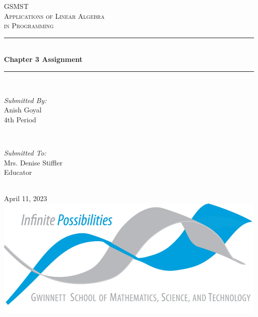 \begin{titlepage}

    \newcommand{\HRule}{\rule{\linewidth}{0.5mm}}
    
    \center
    
    \textsc{\LARGE GSMST }\\[0.3cm]
    \textsc{\Large Applications of Linear Algebra }\\[0.3cm]
    \textsc{\Large in Programming}\\[0.5cm]
    
    \HRule \\[0.4cm]
    { \huge \bfseries Chapter 3 Assignment}\\[0.03cm]
    \HRule \\[1.5cm]
    
    \begin{minipage}{0.4\textwidth}
    \begin{flushleft} \large
    \emph{Submitted By:}\\
    Anish Goyal \\4th Period
    \end{flushleft}
    \end{minipage}
    ~
    \begin{minipage}{0.4\textwidth}
    \begin{flushright} \large
    \emph{Submitted To:} \\
    Mrs. Denise Stiffler\\Educator
    \end{flushright}
    \end{minipage}\\[1cm]
    
    {\large April 11, 2023}\\[1cm]
    
    \includegraphics{logo.png}\\[1cm]
    \vfill
    \end{titlepage}